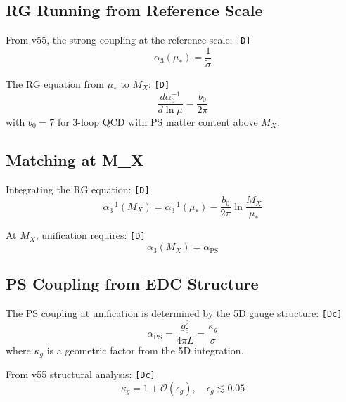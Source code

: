 \documentclass[11pt,a4paper]{article}
\newcommand{\tagD}{\textcolor{green!50!black}{\texttt{[D]}}}
\newcommand{\tagDc}{\textcolor{blue!70!black}{\texttt{[Dc]}}}
\theoremstyle{definition}
\begin{document}
\subsection{RG Running from Reference Scale}
\label{subsec:rg-running}

From v55, the strong coupling at the reference scale: \tagD{}
\begin{equation}
\label{eq:alpha3-mustar}
\alpha_3(\mu_*) = \frac{1}{\tilde{\sigma}}
\end{equation}

The RG equation from $\mu_*$ to $M_X$: \tagD{}
\begin{equation}
\label{eq:rg-equation}
\frac{d\alpha_3^{-1}}{d\ln\mu} = \frac{b_0}{2\pi}
\end{equation}
with $b_0 = 7$ for 3-loop QCD with PS matter content above $M_X$.

\subsection{Matching at M\_X}
\label{subsec:matching-mx}

Integrating the RG equation: \tagD{}
\begin{equation}
\label{eq:rg-integrated}
\alpha_3^{-1}(M_X) = \alpha_3^{-1}(\mu_*) - \frac{b_0}{2\pi} \ln\frac{M_X}{\mu_*}
\end{equation}

At $M_X$, unification requires: \tagD{}
\begin{equation}
\label{eq:unification-condition}
\alpha_3(M_X) = \alpha_{\text{PS}}
\end{equation}

\subsection{PS Coupling from EDC Structure}
\label{subsec:ps-coupling-edc}

The PS coupling at unification is determined by the 5D gauge structure: \tagDc{}
\begin{equation}
\label{eq:alpha-ps-structure}
\alpha_{\text{PS}} = \frac{g_5^2}{4\pi L} = \frac{\kappa_g}{\tilde{\sigma}}
\end{equation}
where $\kappa_g$ is a geometric factor from the 5D integration.

From v55 structural analysis: \tagDc{}
\begin{equation}
\label{eq:kappa-g-value}
\kappa_g = 1 + \mathcal{O}(\epsilon_g), \quad \epsilon_g \lesssim 0.05
\end{equation}
\end{document}
